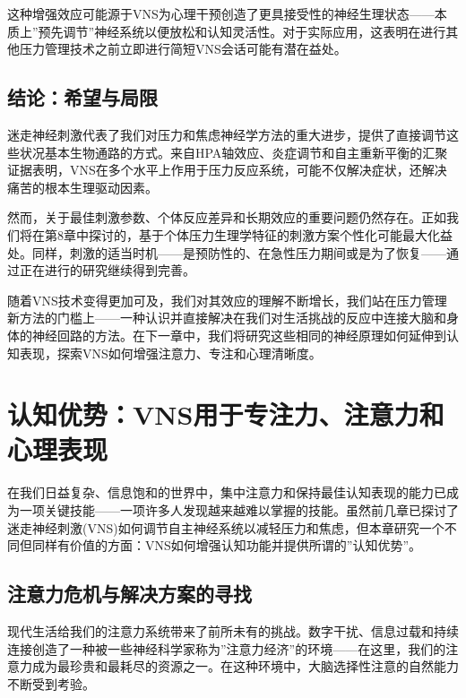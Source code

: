 \documentclass[
  Letterpaper,
]{scrbook}
\begin{document}
这种增强效应可能源于VNS为心理干预创造了更具接受性的神经生理状态------本质上''预先调节''神经系统以便放松和认知灵活性。对于实际应用，这表明在进行其他压力管理技术之前立即进行简短VNS会话可能有潜在益处。

\section{结论：希望与局限}\label{ux7ed3ux8bbaux5e0cux671bux4e0eux5c40ux9650}

迷走神经刺激代表了我们对压力和焦虑神经学方法的重大进步，提供了直接调节这些状况基本生物通路的方式。来自HPA轴效应、炎症调节和自主重新平衡的汇聚证据表明，VNS在多个水平上作用于压力反应系统，可能不仅解决症状，还解决痛苦的根本生理驱动因素。

然而，关于最佳刺激参数、个体反应差异和长期效应的重要问题仍然存在。正如我们将在第8章中探讨的，基于个体压力生理学特征的刺激方案个性化可能最大化益处。同样，刺激的适当时机------是预防性的、在急性压力期间或是为了恢复------通过正在进行的研究继续得到完善。

随着VNS技术变得更加可及，我们对其效应的理解不断增长，我们站在压力管理新方法的门槛上------一种认识并直接解决在我们对生活挑战的反应中连接大脑和身体的神经回路的方法。在下一章中，我们将研究这些相同的神经原理如何延伸到认知表现，探索VNS如何增强注意力、专注和心理清晰度。


\chapter{认知优势：VNS用于专注力、注意力和心理表现}\label{ux8ba4ux77e5ux4f18ux52bfvnsux7528ux4e8eux4e13ux6ce8ux529bux6ce8ux610fux529bux548cux5fc3ux7406ux8868ux73b0}

在我们日益复杂、信息饱和的世界中，集中注意力和保持最佳认知表现的能力已成为一项关键技能------一项许多人发现越来越难以掌握的技能。虽然前几章已探讨了迷走神经刺激(VNS)如何调节自主神经系统以减轻压力和焦虑，但本章研究一个不同但同样有价值的方面：VNS如何增强认知功能并提供所谓的''认知优势''。

\section{注意力危机与解决方案的寻找}\label{ux6ce8ux610fux529bux5371ux673aux4e0eux89e3ux51b3ux65b9ux6848ux7684ux5bfbux627e}

现代生活给我们的注意力系统带来了前所未有的挑战。数字干扰、信息过载和持续连接创造了一种被一些神经科学家称为''注意力经济''的环境------在这里，我们的注意力成为最珍贵和最耗尽的资源之一。在这种环境中，大脑选择性注意的自然能力不断受到考验。
\end{document}
